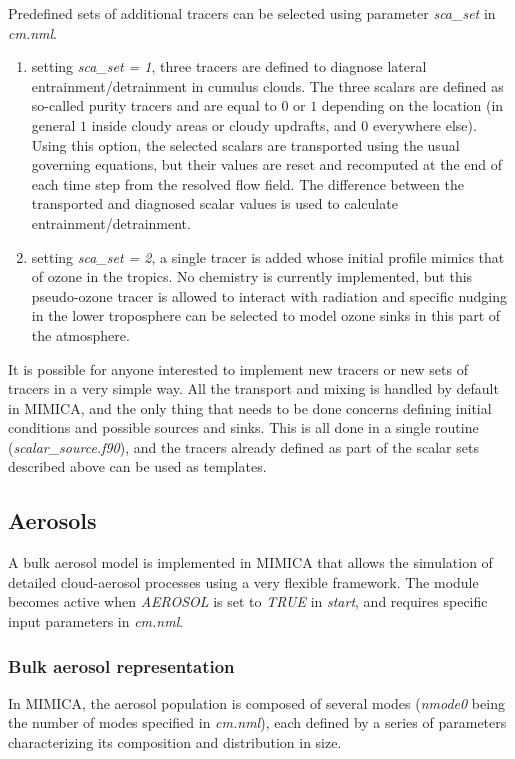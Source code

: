 \documentclass[12pt,A4,french]{article}
\begin{document}
Predefined sets of additional tracers can be selected using parameter {\it sca\_set} in {\it cm.nml}.
\begin{enumerate}
\item setting {\it sca\_set = 1}, three tracers are defined to diagnose lateral entrainment/detrainment in cumulus clouds. The three scalars are defined as so-called purity tracers and are equal to $0$ or $1$ depending on the location (in general $1$ inside cloudy areas or cloudy updrafts, and $0$ everywhere else). Using this option, the selected scalars are transported using the usual governing equations, but their values are reset and recomputed at the end of each time step from the resolved flow field. The difference between the transported and diagnosed scalar values is used to calculate entrainment/detrainment. 
\item setting {\it sca\_set = 2}, a single tracer is added whose initial profile mimics that of ozone in the tropics. No chemistry is currently implemented, but this pseudo-ozone tracer is allowed to interact with radiation and specific nudging in the lower troposphere can be selected to model ozone sinks in this part of the atmosphere. 
\end{enumerate}

It is possible for anyone interested to implement new tracers or new sets of tracers in a very simple way. All the transport and mixing is handled by default in MIMICA, and the only thing that needs to be done concerns defining initial conditions and possible sources and sinks. This is all done in a single routine ({\it scalar\_source.f90}), and the tracers already defined as part of the scalar sets described above can be used as templates. 

\subsection{Aerosols}
\label{aerosols}

A bulk aerosol model is implemented in MIMICA that allows the simulation of detailed cloud-aerosol processes using a very flexible framework. The module becomes active when {\it AEROSOL} is set to {\it TRUE} in {\it start}, and requires specific input parameters in {\it cm.nml}. 

\subsubsection{Bulk aerosol representation}

In MIMICA, the aerosol population is composed of several modes ({\it nmode0} being the number of modes specified in {\it cm.nml}), each defined by a series of parameters characterizing its composition and distribution in size. 
\end{document}
